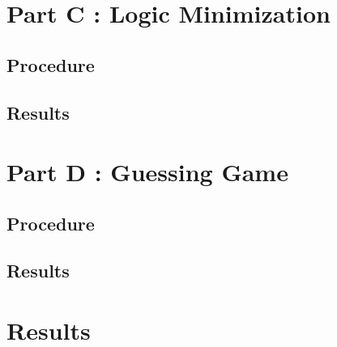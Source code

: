 \documentclass[a4paper,11pt]{article}
\begin{document}
\section{Part C : Logic Minimization}
\subsection{Procedure}
\subsection{Results}

\section{Part D : Guessing Game}
\subsection{Procedure}
\subsection{Results}
\section{Results}
\end{document}
